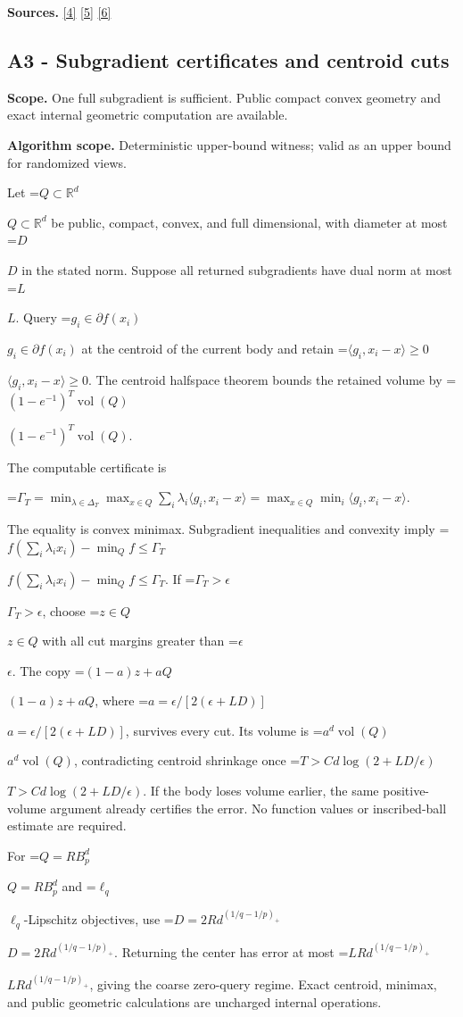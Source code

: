 \documentclass[10pt,a4paper]{article}
\newcommand{\AtlasMath}[1]{\par\begingroup\centering\setbox0=\hbox{$\displaystyle #1$}\ifdim\wd0>1.4\linewidth\typeout{ATLAS WIDE FORMULA: \the\wd0}\fi\ifdim\wd0>\linewidth\resizebox{\linewidth}{!}{\box0}\else\box0\fi\par\endgroup}
\newcommand{\AtlasInlineMath}[1]{\begingroup\setbox0=\hbox{$#1$}\ifdim\wd0>.4\linewidth\endgroup\AtlasMath{#1}\else\endgroup$#1$\fi}
\begin{document}
\textbf{Sources.} \href{https://arxiv.org/pdf/2101.09740v2}{[4]} \href{https://arxiv.org/pdf/2609.33360v2}{[5]} \href{https://arxiv.org/pdf/2609.10874}{[6]}

\subsection{A3 - Subgradient certificates and centroid cuts}
\textbf{Scope.} One full subgradient is sufficient. Public compact convex geometry and exact internal geometric computation are available.

\textbf{Algorithm scope.} Deterministic upper-bound witness; valid as an upper bound for randomized views.

Let \AtlasInlineMath{Q\subset\mathbb R^d} be public, compact, convex, and full dimensional, with diameter at most \AtlasInlineMath{D} in the stated norm. Suppose all returned subgradients have dual norm at most \AtlasInlineMath{L}. Query \AtlasInlineMath{g_i\in\partial f(x_i)} at the centroid of the current body and retain \AtlasInlineMath{\langle g_i,x_i-x\rangle\ge0}. The centroid halfspace theorem bounds the retained volume by \AtlasInlineMath{(1-e^{-1})^T\operatorname{vol}(Q)}.

The computable certificate is

\AtlasMath{\Gamma_T=\min_{\lambda\in\Delta_T}\max_{x\in Q}\sum_i\lambda_i\langle g_i,x_i-x\rangle
=\max_{x\in Q}\min_i\langle g_i,x_i-x\rangle.}

The equality is convex minimax. Subgradient inequalities and convexity imply
\AtlasInlineMath{f(\sum_i\lambda_ix_i)-\min_Qf\le\Gamma_T}.
If \AtlasInlineMath{\Gamma_T>\epsilon}, choose \AtlasInlineMath{z\in Q} with all cut margins greater than \AtlasInlineMath{\epsilon}. The copy \AtlasInlineMath{(1-a)z+aQ}, where \AtlasInlineMath{a=\epsilon/[2(\epsilon+LD)]}, survives every cut. Its volume is \AtlasInlineMath{a^d\operatorname{vol}(Q)}, contradicting centroid shrinkage once \AtlasInlineMath{T>C d\log(2+LD/\epsilon)}. If the body loses volume earlier, the same positive-volume argument already certifies the error. No function values or inscribed-ball estimate are required.

For \AtlasInlineMath{Q=RB_p^d} and \AtlasInlineMath{\ell_q}-Lipschitz objectives, use \AtlasInlineMath{D=2Rd^{(1/q-1/p)_+}}. Returning the center has error at most \AtlasInlineMath{LRd^{(1/q-1/p)_+}}, giving the coarse zero-query regime. Exact centroid, minimax, and public geometric calculations are uncharged internal operations.
\end{document}
